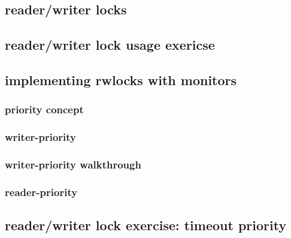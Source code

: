 

\subsection{reader/writer locks}



\subsection{reader/writer lock usage exericse}



\subsection{implementing rwlocks with monitors}



\subsubsection{priority concept}



\subsubsection{writer-priority}



\subsubsection{writer-priority walkthrough}


\subsubsection{reader-priority}



\subsection{reader/writer lock exercise: timeout priority}





